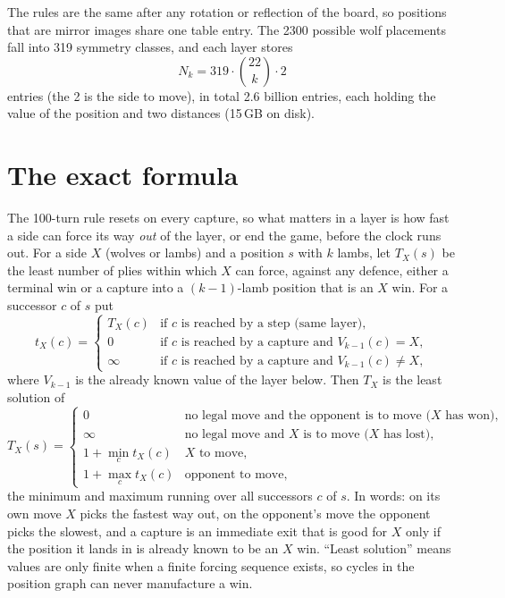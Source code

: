 \documentclass[11pt,a4paper]{article}
\begin{document}
The rules are the same after any rotation or reflection of the board, so
positions that are mirror images share one table entry. The 2300 possible wolf
placements fall into 319 symmetry classes, and each layer stores
\[
N_k = 319 \cdot \binom{22}{k} \cdot 2
\]
entries (the 2 is the side to move), in total 2.6 billion entries, each holding
the value of the position and two distances (15\,GB on disk).

\section*{The exact formula}

The 100-turn rule resets on every capture, so what matters in a layer is how fast
a side can force its way \emph{out} of the layer, or end the game, before the
clock runs out. For a side $X$ (wolves or lambs) and a position $s$ with $k$
lambs, let $T_X(s)$ be the least number of plies within which $X$ can force,
against any defence, either a terminal win or a capture into a $(k-1)$-lamb
position that is an $X$ win. For a successor $c$ of $s$ put
\[
t_X(c)=\begin{cases}
T_X(c) & \text{if $c$ is reached by a step (same layer)},\\
0 & \text{if $c$ is reached by a capture and } V_{k-1}(c)=X,\\
\infty & \text{if $c$ is reached by a capture and } V_{k-1}(c)\ne X,
\end{cases}
\]
where $V_{k-1}$ is the already known value of the layer below. Then $T_X$ is the
least solution of
\begin{equation}\label{eq:T}
T_X(s)=
\begin{cases}
0 & \text{no legal move and the opponent is to move ($X$ has won)},\\
\infty & \text{no legal move and $X$ is to move ($X$ has lost)},\\
1+\min_{c} t_X(c) & \text{$X$ to move},\\
1+\max_{c} t_X(c) & \text{opponent to move},
\end{cases}
\end{equation}
the minimum and maximum running over all successors $c$ of $s$.  In words: on
its own move $X$ picks the fastest way out, on the opponent's move the opponent
picks the slowest, and a capture is an immediate exit that is good for $X$ only
if the position it lands in is already known to be an $X$ win. ``Least solution''
means values are only finite when a finite forcing sequence exists, so cycles in
the position graph can never manufacture a win.
\end{document}

